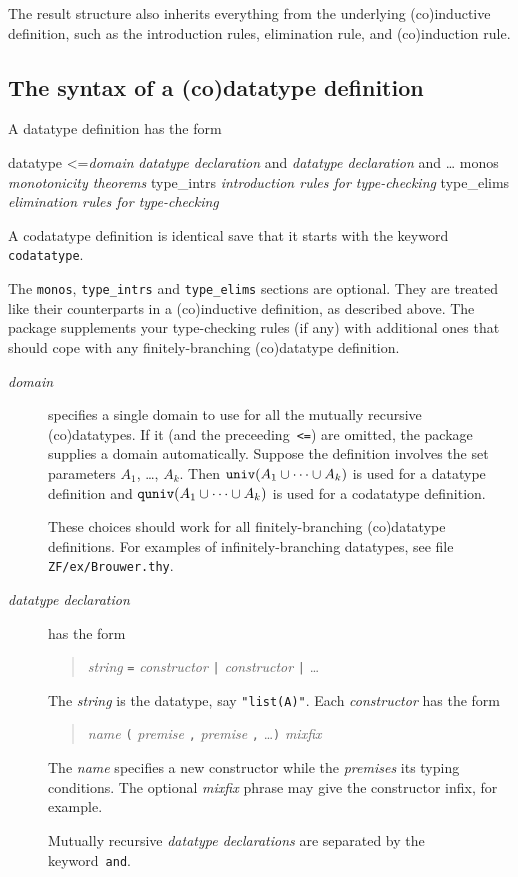 \documentclass[12pt]{article}
\newcommand\univ{\hbox{\tt univ}}
\newcommand\quniv{\hbox{\tt quniv}}
\begin{document}
The result structure also inherits everything from the underlying
(co)inductive definition, such as the introduction rules, elimination rule,
and (co)induction rule.


\subsection{The syntax of a (co)datatype definition}
A datatype definition has the form
\begin{ttbox}
datatype <={\it domain}
 {\it datatype declaration} and {\it datatype declaration} and \ldots
  monos      {\it monotonicity theorems}
  type_intrs {\it introduction rules for type-checking}
  type_elims {\it elimination rules for type-checking}
\end{ttbox}
A codatatype definition is identical save that it starts with the keyword {\tt
  codatatype}.

The {\tt monos}, {\tt type\_intrs} and {\tt type\_elims} sections are
optional.  They are treated like their counterparts in a (co)inductive
definition, as described above.  The package supplements your type-checking
rules (if any) with additional ones that should cope with any
finitely-branching (co)datatype definition.

\begin{description}
\item[\it domain] specifies a single domain to use for all the mutually
  recursive (co)datatypes.  If it (and the preceeding~{\tt <=}) are
  omitted, the package supplies a domain automatically.  Suppose the
  definition involves the set parameters $A_1$, \ldots, $A_k$.  Then
  $\univ(A_1\un\cdots\un A_k)$ is used for a datatype definition and
  $\quniv(A_1\un\cdots\un A_k)$ is used for a codatatype definition.

  These choices should work for all finitely-branching (co)datatype
  definitions.  For examples of infinitely-branching datatypes, 
  see file {\tt ZF/ex/Brouwer.thy}.

\item[\it datatype declaration] has the form
\begin{quote}
 {\it string\/} {\tt =} {\it constructor} {\tt|} {\it constructor} {\tt|}
 \ldots 
\end{quote}
The {\it string\/} is the datatype, say {\tt"list(A)"}.  Each
{\it constructor\/} has the form 
\begin{quote}
 {\it name\/} {\tt(} {\it premise} {\tt,} {\it premise} {\tt,} \ldots {\tt)}
 {\it mixfix\/}
\end{quote}
The {\it name\/} specifies a new constructor while the {\it premises\/} its
typing conditions.  The optional {\it mixfix\/} phrase may give
the constructor infix, for example.

Mutually recursive {\it datatype declarations\/} are separated by the
keyword~{\tt and}.
\end{description}
\end{document}
